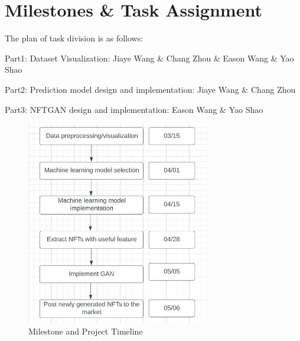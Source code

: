 \section{Milestones \& Task Assignment}
The plan of task division is as follows:

Part1: Dataset Visualization: Jiaye Wang \& Chang Zhou \& Eason Wang \& Yao Shao

Part2: Prediction model design and implementation: Jiaye Wang \& Chang Zhou

Part3: NFTGAN design and implementation: Eason Wang \& Yao Shao


\begin{figure}[htbp] \centering 
\includegraphics[width=8cm]{Figure/Timeline.jpeg} 
\caption{Milestone and Project Timeline} 
\label{fig:graph} 
\end{figure} 





